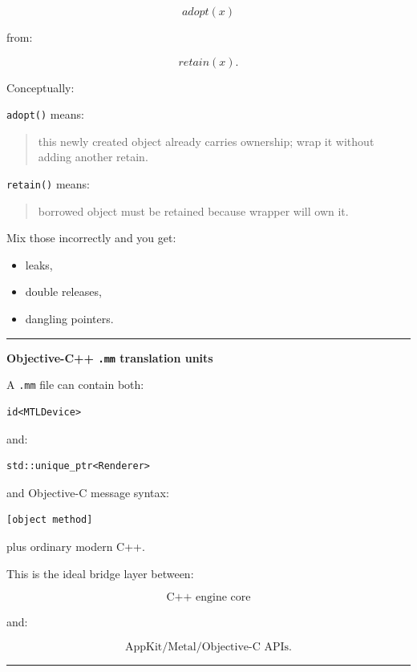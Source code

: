 \[
adopt(x)
\]

from:

\[
retain(x).
\]

Conceptually:

\texttt{adopt()} means:

\begin{quote}
this newly created object already carries ownership; wrap it without adding another retain.
\end{quote}

\texttt{retain()} means:

\begin{quote}
borrowed object must be retained because wrapper will own it.
\end{quote}

Mix those incorrectly and you get:

\begin{itemize}
\tightlist
\item
  leaks,
\item
  double releases,
\item
  dangling pointers.
\end{itemize}

\begin{center}\rule{0.5\linewidth}{0.5pt}\end{center}

\textbf{Objective-C++ \texttt{.mm} translation units}

A \texttt{.mm} file can contain both:

\begin{verbatim}
id<MTLDevice>
\end{verbatim}

and:

\begin{verbatim}
std::unique_ptr<Renderer>
\end{verbatim}

and Objective-C message syntax:

\begin{verbatim}
[object method]
\end{verbatim}

plus ordinary modern C++.

This is the ideal bridge layer between:

\[
\text{C++ engine core}
\]

and:

\[
\text{AppKit/Metal/Objective-C APIs}.
\]

\begin{center}\rule{0.5\linewidth}{0.5pt}\end{center}

